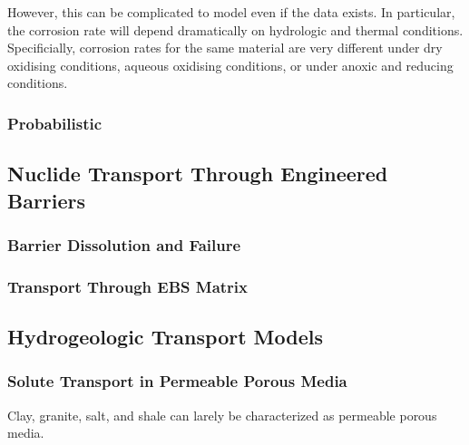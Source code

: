 However, this can be complicated to model even if the data exists. In  
particular, the corrosion rate will depend dramatically on hydrologic 
and thermal conditions. Specificially, corrosion rates for the same 
material are very different under dry oxidising conditions,
aqueous oxidising conditions,
or under anoxic and reducing conditions.

\subsubsection{Probabilistic}


\subsection{Nuclide Transport Through Engineered Barriers}

\subsubsection{Barrier Dissolution and Failure}

\subsubsection{Transport Through EBS Matrix}



\subsection{Hydrogeologic Transport Models}

\subsubsection{Solute Transport in Permeable Porous Media}
Clay, granite, salt, and shale can larely be characterized as 
permeable porous media.

%

